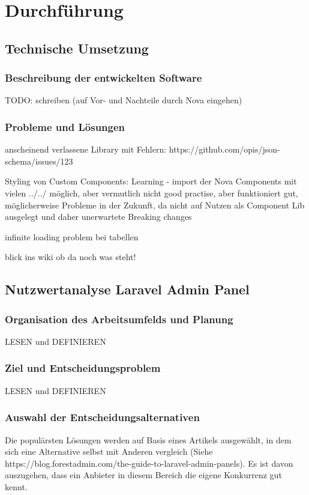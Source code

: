 \section{Durchführung}

\subsection{Technische Umsetzung}

\subsubsection{Beschreibung der entwickelten Software}
TODO: schreiben (auf Vor- und Nachteile durch Nova eingehen)

\subsubsection{Probleme und Lösungen}
anscheinend verlassene Library mit Fehlern: https://github.com/opis/json-schema/issues/123

Styling von Custom Components: Learning - import der Nova Components mit vielen ../../ möglich, aber vermutlich nicht good practise, aber funktioniert gut, möglicherweise Probleme in der Zukunft, da nicht auf Nutzen als Component Lib ausgelegt und daher unerwartete Breaking changes

infinite loading problem bei tabellen

blick ins wiki ob da noch was steht!

\subsection{Nutzwertanalyse Laravel Admin Panel}

\subsubsection{Organisation des Arbeitsumfelds und Planung}
LESEN und DEFINIEREN

\subsubsection{Ziel und Entscheidungsproblem}
LESEN und DEFINIEREN

\subsubsection{Auswahl der Entscheidungsalternativen}
Die populärsten Lösungen werden auf Basis eines Artikels ausgewählt, in dem sich eine Alternative selbst mit Anderen vergleich (Siehe https://blog.forestadmin.com/the-guide-to-laravel-admin-panels).
Es ist davon auszugehen, dass ein Anbieter in diesem Bereich die eigene Konkurrenz gut kennt.

